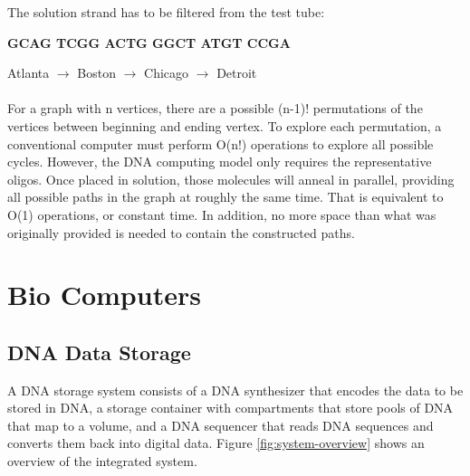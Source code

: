 \documentclass[a4paper]{article}
\begin{document}
The solution strand has to be filtered from the test tube:

\textbf{GCAG TCGG ACTG GGCT ATGT CCGA}

Atlanta $\rightarrow$ Boston $\rightarrow$ Chicago $\rightarrow$ Detroit
\\ \\
For a  graph  with  n  vertices,  there  are  a  possible  (n-1)! permutations of the vertices between beginning and ending vertex. To  explore  each  permutation,  a  conventional  computer  must  perform O(n!)  operations  to  explore  all  possible  cycles.  However,  the  DNA computing model only requires the representative oligos. Once placed in  solution,  those  molecules  will  anneal  in  parallel,  providing  all  possible paths  in  the  graph  at  roughly  the  same  time.  That  is  equivalent  to O(1)  operations,  or  constant  time.  In  addition,  no  more  space  than what  was  originally  provided  is  needed  to  contain  the  constructed paths.

\section{Bio Computers}
\subsection{DNA Data Storage}
A DNA storage system consists of a DNA synthesizer that encodes the data to be stored in DNA, a storage container
with compartments that store pools of DNA that map to a volume, and a DNA sequencer that reads DNA sequences
and converts them back into digital data. Figure \ref{fig:system-overview} shows an overview of the integrated system.
\end{document}
